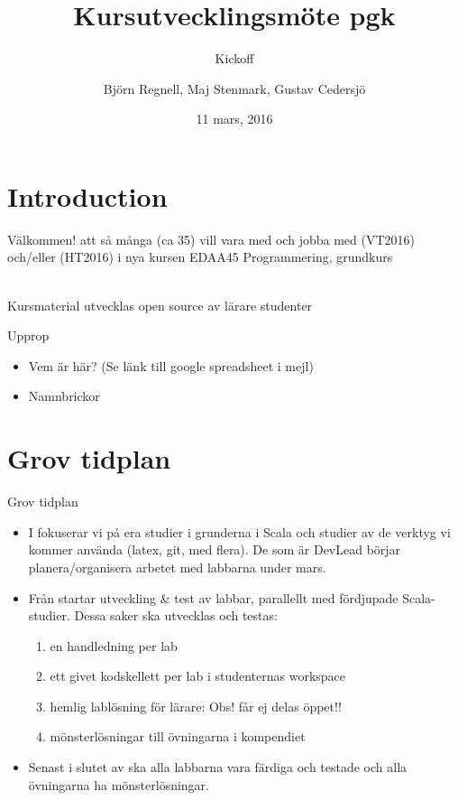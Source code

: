 \documentclass{slides}
\title[Kursutvecklingsmöte pgk]{Kursutvecklingsmöte pgk}
\subtitle{Kickoff}
\author{Björn Regnell, Maj Stenmark, Gustav Cedersjö}
\institute{Datavetenskap, LTH}
\date{11 mars, 2016}
\begin{document}
\frame{\titlepage}

\section{Introduction}
\begin{Slide}{Välkommen!}
 att så många (ca 35) vill vara med och jobba med  (VT2016) och/eller  (HT2016) i nya kursen EDAA45 Programmering, grundkurs 

\vspace{2em}
\\ Kursmaterial utvecklas open source av lärare  studenter 
\end{Slide}

\begin{Slide}{Upprop}
\begin{itemize}
\item Vem är här? (Se länk till google spreadsheet i mejl)
\item Namnbrickor
\end{itemize}
\end{Slide}

\section{Grov tidplan}

\begin{Slide}{Grov tidplan}
\begin{itemize}
\item I  fokuserar vi på era studier i grunderna i Scala och studier av de verktyg vi kommer använda (latex, git, med flera). De som är DevLead börjar planera/organisera arbetet med labbarna under mars.

\item Från  startar utveckling \& test av labbar, parallellt med fördjupade Scala-studier. Dessa saker ska utvecklas och testas:
\begin{enumerate}
\item en handledning per lab
\item ett givet kodskellett per lab i studenternas workspace
\item hemlig lablösning för lärare: Obs! får ej delas öppet!!
\item mönsterlösningar till övningarna i kompendiet
\end{enumerate}

\item Senast i slutet av  ska alla labbarna vara färdiga och testade och alla övningarna ha mönsterlösningar.
\end{itemize}
\end{Slide}
\end{document}
